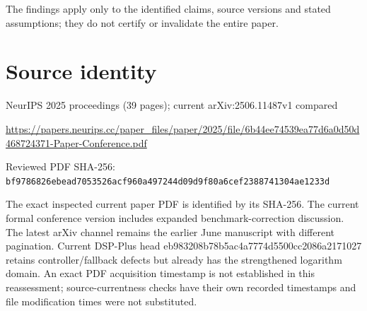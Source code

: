 \documentclass[11pt]{article}
\begin{document}
The findings apply only to the identified claims, source versions and stated assumptions; they do not certify or invalidate the entire paper.\par

\section*{Source identity}

NeurIPS 2025 proceedings (39 pages); current arXiv:2506.11487v1 compared

\url{https://papers.neurips.cc/paper_files/paper/2025/file/6b44ee74539ea77d6a0d50d468724371-Paper-Conference.pdf}

Reviewed PDF SHA-256: \nolinkurl{bf9786826ebead7053526acf960a497244d09d9f80a6cef2388741304ae1233d}

The exact inspected current paper PDF is identified by its SHA-256. The current formal conference version includes expanded benchmark-correction discussion. The latest arXiv channel remains the earlier June manuscript with different pagination. Current DSP-Plus head eb983208b78b5ac4a7774d5500cc2086a2171027 retains controller/fallback defects but already has the strengthened logarithm domain. An exact PDF acquisition timestamp is not established in this reassessment; source-currentness checks have their own recorded timestamps and file modification times were not substituted.
\end{document}
